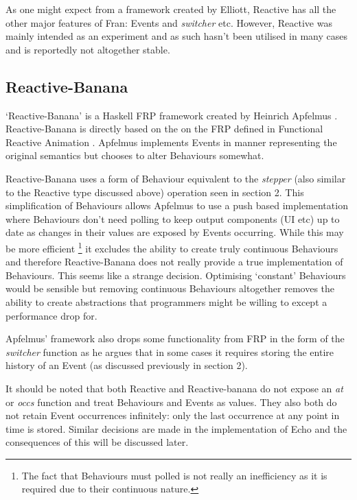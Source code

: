       As one might expect from a framework created by Elliott, Reactive has all the other major features
      of Fran: Events and \emph{switcher} etc. However, Reactive was mainly intended as an experiment
      and as such hasn't been utilised in many cases and is reportedly not altogether stable.
  
    \subsection{Reactive-Banana}
      `Reactive-Banana' is a Haskell FRP framework created by Heinrich Apfelmus \cite{Apfelmus}. Reactive-Banana
      is directly based on the on the FRP defined in Functional Reactive Animation \cite{Elliott1997}. Apfelmus
      implements Events in manner representing the original semantics but chooses to alter
      Behaviours somewhat. 
      
      Reactive-Banana uses a form of Behaviour equivalent to the \emph{stepper}
      (also similar to the Reactive type discussed above) operation seen in section 2. This simplification of Behaviours allows 
      Apfelmus to use a push
      based implementation where Behaviours don't need polling to keep output components (UI etc) up to date as changes in their values are exposed
      by Events occurring. While this may be more efficient \footnote{The fact that Behaviours must polled is not really an inefficiency as it is required due to their continuous nature. } it excludes the ability to create truly 
      continuous Behaviours and therefore Reactive-Banana does not really provide a true implementation
      of Behaviours. This seems like a strange decision. Optimising `constant' Behaviours would be sensible
      but removing continuous Behaviours altogether removes the ability to create abstractions that programmers
      might be willing to except a performance drop for.
      
      Apfelmus' framework also drops some functionality from FRP in the form of the \emph{switcher} function as
      he argues that in some cases it requires storing the entire history of an Event (as discussed previously
      in section 2).
      
    It should be noted that both Reactive and Reactive-banana do not expose an \emph{at} or \emph{occs} function
    and treat Behaviours and Events as values. They also both do not retain Event occurrences infinitely: only the last
    occurrence at any point in time is stored. Similar decisions are made in the implementation of Echo
    and the consequences of this will be discussed later.

